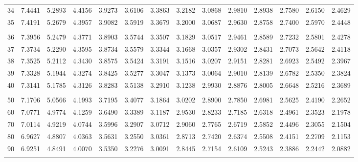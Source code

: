 {\begin{tabular}{l|lllllllllllll}
 34 & 7.4441 & 5.2893 & 4.4156 & 3.9273 & 3.6106 & 3.3863 & 3.2182 & 3.0868 & 2.9810 & 2.8938 & 2.7580 & 2.6150 & 2.4629 \\[5pt] \arrayrulecolor{light-gray}\hline\arrayrulecolor{black}  
 35 & 7.4191 & 5.2679 & 4.3957 & 3.9082 & 3.5919 & 3.3679 & 3.2000 & 3.0687 & 2.9630 & 2.8758 & 2.7400 & 2.5970 & 2.4448 \\[5pt] \arrayrulecolor{light-gray}\hline\arrayrulecolor{black}  
\\ 
 36 & 7.3956 & 5.2479 & 4.3771 & 3.8903 & 3.5744 & 3.3507 & 3.1829 & 3.0517 & 2.9461 & 2.8589 & 2.7232 & 2.5801 & 2.4278 \\[5pt] \arrayrulecolor{light-gray}\hline\arrayrulecolor{black}  
 37 & 7.3734 & 5.2290 & 4.3595 & 3.8734 & 3.5579 & 3.3344 & 3.1668 & 3.0357 & 2.9302 & 2.8431 & 2.7073 & 2.5642 & 2.4118 \\[5pt] \arrayrulecolor{light-gray}\hline\arrayrulecolor{black}  
 38 & 7.3525 & 5.2112 & 4.3430 & 3.8575 & 3.5424 & 3.3191 & 3.1516 & 3.0207 & 2.9151 & 2.8281 & 2.6923 & 2.5492 & 2.3967 \\[5pt] \arrayrulecolor{light-gray}\hline\arrayrulecolor{black}  
 39 & 7.3328 & 5.1944 & 4.3274 & 3.8425 & 3.5277 & 3.3047 & 3.1373 & 3.0064 & 2.9010 & 2.8139 & 2.6782 & 2.5350 & 2.3824 \\[5pt] \arrayrulecolor{light-gray}\hline\arrayrulecolor{black}  
 40 & 7.3141 & 5.1785 & 4.3126 & 3.8283 & 3.5138 & 3.2910 & 3.1238 & 2.9930 & 2.8876 & 2.8005 & 2.6648 & 2.5216 & 2.3689 \\[5pt] \arrayrulecolor{light-gray}\hline\arrayrulecolor{black}  
\\ 
 50 & 7.1706 & 5.0566 & 4.1993 & 3.7195 & 3.4077 & 3.1864 & 3.0202 & 2.8900 & 2.7850 & 2.6981 & 2.5625 & 2.4190 & 2.2652 \\[5pt] \arrayrulecolor{light-gray}\hline\arrayrulecolor{black}  
 60 & 7.0771 & 4.9774 & 4.1259 & 3.6490 & 3.3389 & 3.1187 & 2.9530 & 2.8233 & 2.7185 & 2.6318 & 2.4961 & 2.3523 & 2.1978 \\[5pt] \arrayrulecolor{light-gray}\hline\arrayrulecolor{black}  
 70 & 7.0114 & 4.9219 & 4.0744 & 3.5996 & 3.2907 & 3.0712 & 2.9060 & 2.7765 & 2.6719 & 2.5852 & 2.4496 & 2.3055 & 2.1504 \\[5pt] \arrayrulecolor{light-gray}\hline\arrayrulecolor{black}  
 80 & 6.9627 & 4.8807 & 4.0363 & 3.5631 & 3.2550 & 3.0361 & 2.8713 & 2.7420 & 2.6374 & 2.5508 & 2.4151 & 2.2709 & 2.1153 \\[5pt] \arrayrulecolor{light-gray}\hline\arrayrulecolor{black}  
 90 & 6.9251 & 4.8491 & 4.0070 & 3.5350 & 3.2276 & 3.0091 & 2.8445 & 2.7154 & 2.6109 & 2.5243 & 2.3886 & 2.2442 & 2.0882 \\[5pt] \arrayrulecolor{light-gray}\hline\arrayrulecolor{black}  

\end{tabular}}
